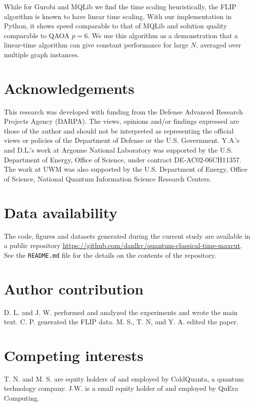While for Gurobi and MQLib we find the time scaling heuristically, the FLIP algorithm is known to have linear time scaling. With our implementation in Python, it shows speed comparable to that of MQLib and solution quality comparable to QAOA $p=6$.
We use this algorithm as a demonstration that a linear-time algorithm can give constant performance for large $N$, averaged over multiple graph instances.




\section{Acknowledgements}

This research was developed with funding from the Defense Advanced Research Projects Agency (DARPA). The views, opinions and/or findings expressed are those of the author and should not be interpreted as representing the official views or policies of the Department of Defense or the U.S. Government.
 Y.A.’s and D.L.'s work at Argonne National Laboratory was supported by the U.S. Department of Energy, Office of Science, under contract DE-AC02-06CH11357.
The work at UWM was also supported by the U.S. Department of Energy, Office of Science, National Quantum Information Science Research Centers.
\\

\section{Data availability}
The code, figures and datasets generated during the current study are available in a public repository
\url{https://github.com/danlkv/quantum-classical-time-maxcut}.
See the \texttt{README.md} file for the details on the contents of the repository.


\section{Author contribution}

D. L. and J. W. performed and analyzed the experiments and wrote the main text.
C. P. generated the FLIP data. M. S., T. N, and Y. A.
edited the paper.

\section{Competing interests}

T. N. and M. S. are equity holders of and employed by ColdQuanta, a quantum technology company.
J.W. is a small equity holder of and employed by QuEra Computing.

